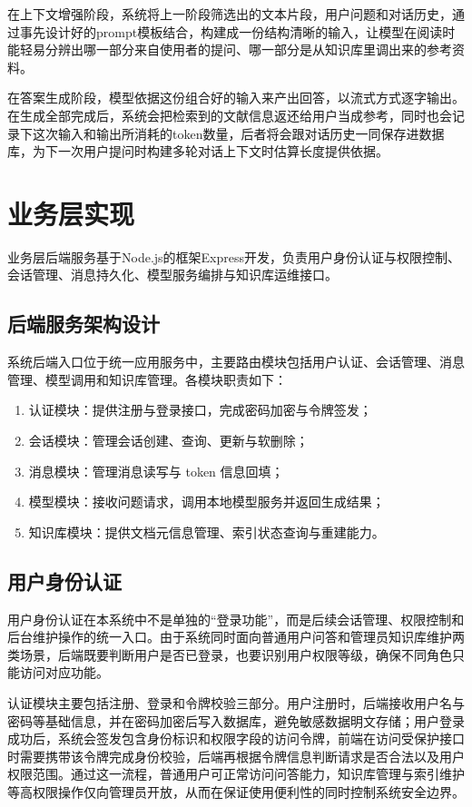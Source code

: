 在上下文增强阶段，系统将上一阶段筛选出的文本片段，用户问题和对话历史，通过事先设计好的prompt模板结合，构建成一份结构清晰的输入，让模型在阅读时能轻易分辨出哪一部分来自使用者的提问、哪一部分是从知识库里调出来的参考资料。

在答案生成阶段，模型依据这份组合好的输入来产出回答，以流式方式逐字输出。在生成全部完成后，系统会把检索到的文献信息返还给用户当成参考，同时也会记录下这次输入和输出所消耗的token数量，后者将会跟对话历史一同保存进数据库，为下一次用户提问时构建多轮对话上下文时估算长度提供依据。

\section{业务层实现}

业务层后端服务基于Node.js的框架Express开发，负责用户身份认证与权限控制、会话管理、消息持久化、模型服务编排与知识库运维接口。

\subsection{后端服务架构设计}

系统后端入口位于统一应用服务中，主要路由模块包括用户认证、会话管理、消息管理、模型调用和知识库管理。各模块职责如下：
\begin{enumerate}[label =(\arabic*)]

    \item 认证模块：提供注册与登录接口，完成密码加密与令牌签发；
    \item 会话模块：管理会话创建、查询、更新与软删除；
    \item 消息模块：管理消息读写与 token 信息回填；
    \item 模型模块：接收问题请求，调用本地模型服务并返回生成结果；
    \item 知识库模块：提供文档元信息管理、索引状态查询与重建能力。

\end{enumerate}

\subsection{用户身份认证}

用户身份认证在本系统中不是单独的“登录功能”，而是后续会话管理、权限控制和后台维护操作的统一入口。由于系统同时面向普通用户问答和管理员知识库维护两类场景，后端既要判断用户是否已登录，也要识别用户权限等级，确保不同角色只能访问对应功能。

认证模块主要包括注册、登录和令牌校验三部分。用户注册时，后端接收用户名与密码等基础信息，并在密码加密后写入数据库，避免敏感数据明文存储；用户登录成功后，系统会签发包含身份标识和权限字段的访问令牌，前端在访问受保护接口时需要携带该令牌完成身份校验，后端再根据令牌信息判断请求是否合法以及用户权限范围。通过这一流程，普通用户可正常访问问答能力，知识库管理与索引维护等高权限操作仅向管理员开放，从而在保证使用便利性的同时控制系统安全边界。

